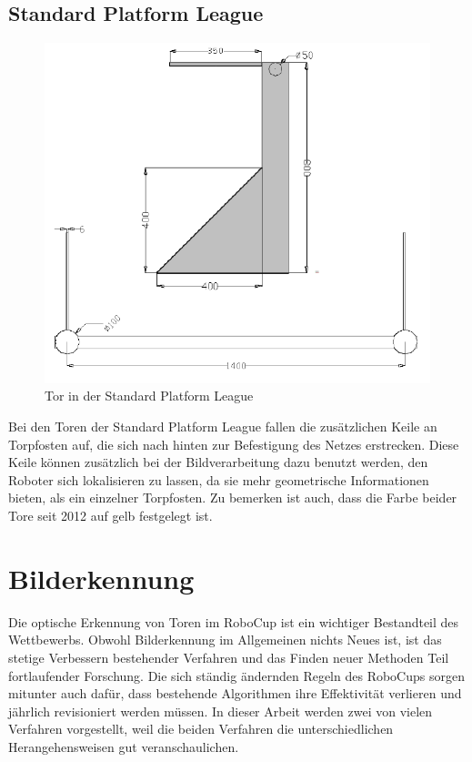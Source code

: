 \documentclass[a4paper,12pt]{article}
\begin{document}
\subsection{Standard Platform League}
\begin{figure}[H]
\includegraphics[scale=0.8]{spl-goal.png}
\caption{Tor in der Standard Platform League}
\label{fig:goal-spl}
\end{figure}
Bei den Toren der Standard Platform League fallen die zusätzlichen Keile an Torpfosten auf, die
sich nach hinten zur Befestigung des Netzes erstrecken. Diese Keile können zusätzlich bei der
Bildverarbeitung dazu benutzt werden, den Roboter sich lokalisieren zu lassen, da sie mehr
geometrische Informationen bieten, als ein einzelner Torpfosten. Zu bemerken ist auch, dass die
Farbe beider Tore seit 2012 auf gelb festgelegt ist.

\section{Bilderkennung}
Die optische Erkennung von Toren im RoboCup ist ein wichtiger Bestandteil des Wettbewerbs. Obwohl
Bilderkennung im Allgemeinen nichts Neues ist, ist das stetige Verbessern bestehender Verfahren und das
Finden neuer Methoden Teil fortlaufender Forschung. Die sich ständig ändernden Regeln des RoboCups
sorgen mitunter auch dafür, dass bestehende Algorithmen ihre Effektivität verlieren und jährlich
revisioniert werden müssen. In dieser Arbeit werden zwei von vielen Verfahren vorgestellt, weil die
beiden Verfahren die unterschiedlichen Herangehensweisen gut veranschaulichen.
\end{document}
